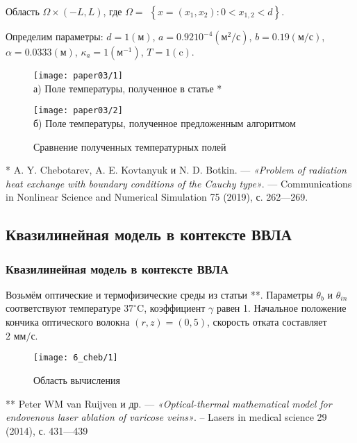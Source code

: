 \begin{frame}
    Область $\Omega \times(-L, L)$,
    где $\Omega=$ $\left\{x=\left(x_{1}, x_{2}\right): 0<x_{1,2}<d\right\}$.


    Определим параметры:
    $d=1(\text{м})$, $a=0.9210^{-4}(\text{м}^{2} / \text{с})$,
    $b=0.19(\text{м} / \text{с})$, $\alpha=0.0333(\text{м})$,
    $\kappa_{a}=1\left(\text{м}^{-1}\right)$, $T = 1(\text{c})$.
    \begin{figure}[h!t]
        \begin{minipage}[b][][b]{0.49\linewidth}
            \centering
            \texttt{[image: paper03/1]} \\ а) Поле температуры,
            полученное в статье *
        \end{minipage}
        \hfill
        \begin{minipage}[b][][b]{0.49\linewidth}
            \centering
            \texttt{[image: paper03/2]} \\
            б) Поле температуры, полученное предложенным алгоритмом
        \end{minipage}
        \caption{Сравнение полученных температурных полей}
        \label{fig:4_3:1}
    \end{figure}
    \tiny{* A. Y. Chebotarev, A. E. Kovtanyuk и N. D. Botkin. — \textit{«Problem of
    radiation heat exchange with boundary conditions of the Cauchy type»}. —
    Communications in Nonlinear Science and Numerical Simulation 75 (2019),
        с. 262—269.}
\end{frame}

\subsection{Квазилинейная модель в контексте ВВЛА}
\begin{frame}
    \frametitle{Квазилинейная модель в контексте ВВЛА}
    Возьмём оптические и термофизические среды из статьи **.
    Параметры $\theta_{b}$ и $\theta_{i n}$ соответствуют
    температуре $37^{\circ} \text{C}$, коэффициент $\gamma$ равен 1.
    Начальное положение кончика оптического волокна $(r, z)=(0,5)$,
    скорость отката составляет $2 \text{~мм} / \text{с}$.

    \begin{figure}[h!t]
        \texttt{[image: 6\_cheb/1]}
        \caption{Область вычисления}
        \label{fig:4_3:3}
    \end{figure}
    \tiny{** Peter WM van Ruijven и др. — \textit{«Optical-thermal mathematical model for
    endovenous laser ablation of varicose veins»}. -- Lasers in medical science
    29 (2014), с. 431—439}
\end{frame}


